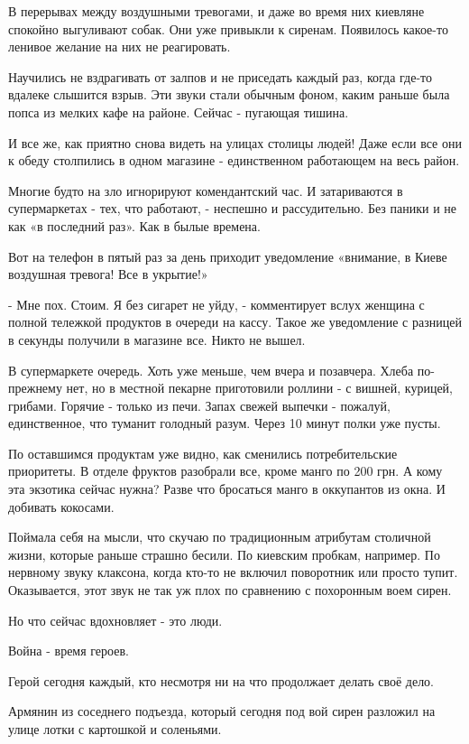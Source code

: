 В перерывах между воздушными тревогами, и даже во время них киевляне спокойно
выгуливают собак. Они уже привыкли к сиренам. Появилось какое-то ленивое
желание на них не реагировать. 

Научились не вздрагивать от залпов и не приседать каждый раз, когда где-то
вдалеке слышится взрыв. Эти звуки стали обычным фоном, каким раньше была попса
из мелких кафе на районе. Сейчас - пугающая тишина.

И все же, как приятно снова видеть на улицах столицы людей!  Даже если все они
к обеду столпились в одном магазине - единственном работающем на весь район. 

Многие будто на зло игнорируют комендантский час. И затариваются в
супермаркетах - тех, что работают, - неспешно и рассудительно. Без паники и не
как «в последний раз». Как в былые времена. 

Вот на телефон в пятый раз за день приходит уведомление «внимание, в Киеве
воздушная тревога! Все в укрытие!» 

- Мне пох. Стоим. Я без сигарет не уйду, - комментирует вслух женщина с полной
тележкой продуктов в очереди на кассу. Такое же уведомление с разницей в
секунды получили в магазине все. Никто не вышел. 

В супермаркете очередь. Хоть уже меньше, чем вчера и позавчера. Хлеба
по-прежнему нет, но в местной пекарне приготовили роллини - с вишней, курицей,
грибами. Горячие - только из печи. Запах свежей выпечки - пожалуй,
единственное, что туманит голодный разум. Через 10 минут полки уже пусты. 

По оставшимся продуктам уже видно, как сменились потребительские приоритеты. В
отделе фруктов разобрали все, кроме манго по 200 грн. А кому эта экзотика
сейчас нужна? Разве что бросаться манго в оккупантов из окна. И добивать
кокосами. 

Поймала себя на мысли, что скучаю по традиционным атрибутам столичной жизни,
которые раньше страшно бесили. По киевским пробкам, например. По нервному звуку
клаксона, когда кто-то не включил поворотник или просто тупит. Оказывается,
этот звук не так уж плох по сравнению с похоронным воем сирен. 

Но что сейчас вдохновляет - это люди. 

Война - время героев. 

Герой сегодня каждый, кто несмотря ни на что продолжает делать своё дело. 

Армянин из соседнего подъезда, который сегодня под вой сирен разложил на улице
лотки с картошкой и соленьями. 

